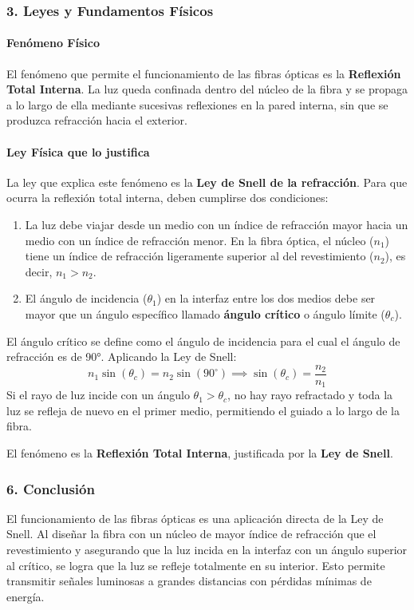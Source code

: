 \subsubsection*{3. Leyes y Fundamentos Físicos}
\paragraph*{Fenómeno Físico}
El fenómeno que permite el funcionamiento de las fibras ópticas es la \textbf{Reflexión Total Interna}. La luz queda confinada dentro del núcleo de la fibra y se propaga a lo largo de ella mediante sucesivas reflexiones en la pared interna, sin que se produzca refracción hacia el exterior.

\paragraph*{Ley Física que lo justifica}
La ley que explica este fenómeno es la \textbf{Ley de Snell de la refracción}. Para que ocurra la reflexión total interna, deben cumplirse dos condiciones:
\begin{enumerate}
    \item La luz debe viajar desde un medio con un índice de refracción mayor hacia un medio con un índice de refracción menor. En la fibra óptica, el núcleo ($n_1$) tiene un índice de refracción ligeramente superior al del revestimiento ($n_2$), es decir, $n_1 > n_2$.
    \item El ángulo de incidencia ($\theta_1$) en la interfaz entre los dos medios debe ser mayor que un ángulo específico llamado \textbf{ángulo crítico} o ángulo límite ($\theta_c$).
\end{enumerate}
El ángulo crítico se define como el ángulo de incidencia para el cual el ángulo de refracción es de 90°. Aplicando la Ley de Snell:
$$n_1 \sin(\theta_c) = n_2 \sin(90^\circ) \implies \sin(\theta_c) = \frac{n_2}{n_1}$$
Si el rayo de luz incide con un ángulo $\theta_1 > \theta_c$, no hay rayo refractado y toda la luz se refleja de nuevo en el primer medio, permitiendo el guiado a lo largo de la fibra.

\begin{cajaresultado}
El fenómeno es la \textbf{Reflexión Total Interna}, justificada por la \textbf{Ley de Snell}.
\end{cajaresultado}

\subsubsection*{6. Conclusión}
\begin{cajaconclusion}
El funcionamiento de las fibras ópticas es una aplicación directa de la Ley de Snell. Al diseñar la fibra con un núcleo de mayor índice de refracción que el revestimiento y asegurando que la luz incida en la interfaz con un ángulo superior al crítico, se logra que la luz se refleje totalmente en su interior. Esto permite transmitir señales luminosas a grandes distancias con pérdidas mínimas de energía.
\end{cajaconclusion}

